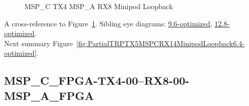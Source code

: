 \begin{figure}[h]
\begin{subfigure}{0.33\textwidth}
\hyperref[sec:MSPCFPGATX406RX806MSPAFPGA6.4-optimized]{}
\end{subfigure}\hspace*{\fill}
\begin{subfigure}{0.33\textwidth}
\hyperref[sec:MSPCFPGATX407RX807MSPAFPGA6.4-optimized]{}
\end{subfigure}\hspace*{\fill}
\begin{subfigure}{0.33\textwidth}
\hyperref[sec:MSPCFPGATX408RX808MSPAFPGA6.4-optimized]{}
\end{subfigure}

\begin{subfigure}{0.33\textwidth}
\hyperref[sec:MSPCFPGATX409RX809MSPAFPGA6.4-optimized]{}
\end{subfigure}\hspace*{\fill}
\begin{subfigure}{0.33\textwidth}
\hyperref[sec:MSPCFPGATX410RX810MSPAFPGA6.4-optimized]{}
\end{subfigure}\hspace*{\fill}
\begin{subfigure}{0.33\textwidth}
\hyperref[sec:MSPCFPGATX411RX811MSPAFPGA6.4-optimized]{}
\end{subfigure}

\caption{MSP\_C TX4 MSP\_A RX8 Minipod Loopback} \label{fig:MSPCTX4MSPARX8MinipodLoopback6.4-optimized}
\end{figure}

A cross-reference to Figure~\ref{fig:MSPCTX4MSPARX8MinipodLoopback6.4-optimized}.
Sibling eye diagrams: \hyperref[sec:MSPCTX4MSPARX8MinipodLoopback9.6-optimized]{9.6-optimized}, \hyperref[sec:MSPCTX4MSPARX8MinipodLoopback12.8-optimized]{12.8-optimized}. \\
Next summary Figure~\ref{fig:PartialTRPTX5MSPCRX14MinipodLoopback6.4-optimized}.
\clearpage
% 
\subsection{MSP\_C\_FPGA-TX4-00--RX8-00-MSP\_A\_FPGA}\label{sec:MSPCFPGATX400RX800MSPAFPGA6.4-optimized}

